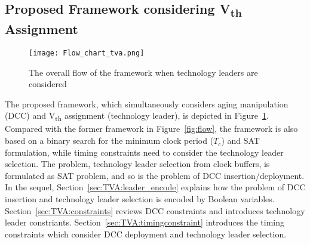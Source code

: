 \subsection{Proposed Framework considering V\textsubscript{th} Assignment}
\label{sec:TVA:framework}
\begin{figure}
	\centering
	\texttt{[image: Flow\_chart\_tva.png]}
	\caption{The overall flow of the framework when technology leaders are considered }
	\label{fig:flow:tva}
\end{figure}
The proposed framework, which simultaneously considers aging manipulation (DCC) and V\textsubscript{th} assignment (technology leader), is depicted in Figure~\ref{fig:flow:tva}. Compared with the former framework in Figure~\ref{fig:flow}, the framework is also based on a binary search for the minimum clock period ($T_c$) and SAT formulation, while timing constraints need to consider the technology leader selection. The problem, technology leader selection from clock buffers, is formulated as SAT problem, and so is the problem of DCC insertion/deployment. In the sequel, Section~\ref{sec:TVA:leader_encode} explains how the problem of DCC insertion and technology leader selection is encoded by Boolean variables. Section~\ref{sec:TVA:constraints} reviews DCC constraints and introduces technology leader constriants. Section~\ref{sec:TVA:timingconstraint} introduces the timing constraints which consider DCC deployment and technology leader selection.


